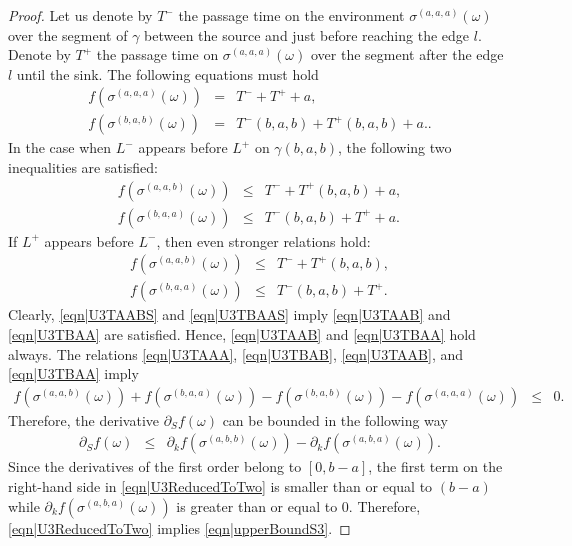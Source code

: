 \documentclass[reqno]{amsart}
\begin{document}
\begin{proof}
Let us denote by $T^-$ the passage time on the environment $\sigma^{(a,a,a)}(\omega)$ over the segment of $\gamma$ between the source and just before reaching the edge $l$. Denote by $T^+$ the passage time on $\sigma^{(a,a,a)}(\omega)$ over the segment
after the edge $l$ until the sink. The following equations must hold
\begin{eqnarray}
f(\sigma^{(a,a,a)}(\omega))&=& T^-+T^++a,\label{eqn|U3TAAA}\\
f(\sigma^{(b,a,b)}(\omega))&=& T^-(b,a,b)+T^+(b,a,b)+a.\label{eqn|U3TBAB}.\end{eqnarray}
In the case when $L^-$ appears before $L^+$ on $\gamma(b,a,b)$, the following two inequalities are satisfied:
\begin{eqnarray}
f(\sigma^{(a,a,b)}(\omega))&\leq& T^-+T^+(b,a,b)+a,\label{eqn|U3TAAB}\\
f(\sigma^{(b,a,a)}(\omega))&\leq& T^-(b,a,b)+T^++a.\label{eqn|U3TBAA}
\end{eqnarray}
If $L^+$ appears before $L^-$, then even stronger relations hold:
\begin{eqnarray}
f(\sigma^{(a,a,b)}(\omega))&\leq& T^-+T^+(b,a,b),\label{eqn|U3TAABS}\\
f(\sigma^{(b,a,a)}(\omega))&\leq& T^-(b,a,b)+T^+.\label{eqn|U3TBAAS}
\end{eqnarray}
Clearly, \eqref{eqn|U3TAABS} and \eqref{eqn|U3TBAAS} imply \eqref{eqn|U3TAAB} and \eqref{eqn|U3TBAA} are satisfied. Hence,  \eqref{eqn|U3TAAB} and \eqref{eqn|U3TBAA} hold always.
The relations \eqref{eqn|U3TAAA}, \eqref{eqn|U3TBAB}, \eqref{eqn|U3TAAB}, and \eqref{eqn|U3TBAA} imply 
\begin{eqnarray} f(\sigma^{(a,a,b)}(\omega))+f(\sigma^{(b,a,a)}(\omega))-f(\sigma^{(b,a,b)}(\omega))-f(\sigma^{(a,a,a)}(\omega))
&\leq& 0.\label{eqn|U3HelpfulCancelation}
\end{eqnarray}
Therefore, the derivative $\partial_Sf(\omega)$ can be bounded in the following way
\begin{eqnarray}
\partial_Sf(\omega)&\leq& \partial_kf(\sigma^{(a,b,b)}(\omega))-\partial_kf(\sigma^{(a,b,a)}(\omega)).
\label{eqn|U3ReducedToTwo}
\end{eqnarray}
Since the derivatives of the first order belong to $[0,b-a]$, the first term on the right-hand side in
\eqref{eqn|U3ReducedToTwo} is smaller than or equal to $(b-a)$ while $\partial_kf(\sigma^{(a,b,a)}(\omega))$ is greater than or equal to $0$. Therefore, \eqref{eqn|U3ReducedToTwo}  implies \eqref{eqn|upperBoundS3}.
\end{proof}
\end{document}
